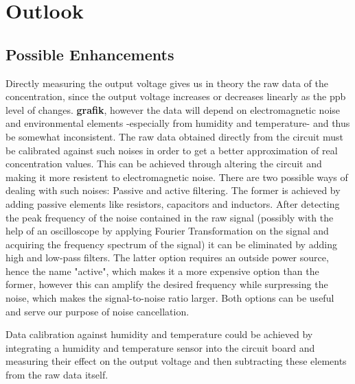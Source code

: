 \chapter{Outlook}
\label{sec:outlook}

\section{Possible Enhancements}
Directly measuring the output voltage gives us in theory the raw data of the  concentration, since the output voltage increases or decreases linearly as the ppb level of  changes. \textbf{grafik}, however the data will depend on electromagnetic noise and environmental elements -especially from humidity and temperature- and thus be somewhat inconsistent. The raw data obtained directly from the circuit must be calibrated against such noises in order to get a better approximation of real concentration values. This can be achieved through altering the circuit and making it more resistent to electromagnetic noise. There are two possible ways of dealing with such noises: Passive and active filtering. The former is achieved by adding passive elements like resistors, capacitors and inductors. After detecting the peak frequency of the noise contained in the raw signal (possibly with the help of an oscilloscope by applying Fourier Transformation on the signal and acquiring the frequency spectrum of the signal) it can be eliminated by adding high and low-pass filters. The latter option requires an outside power source, hence the name "active", which makes it a more expensive option than the former, however this can amplify the desired frequency while surpressing the noise, which makes the signal-to-noise ratio larger. Both options can be useful and serve our purpose of noise cancellation.\par 
Data calibration against humidity and temperature could be achieved by integrating a humidity and temperature sensor into the circuit board and measuring their effect on the output voltage and then subtracting these elements from the raw data itself.

